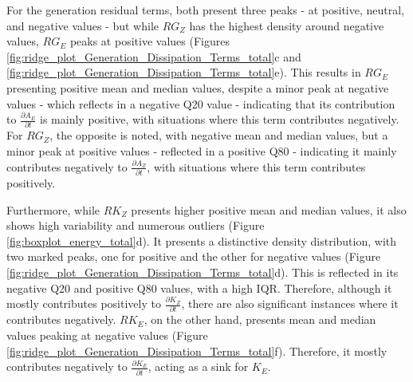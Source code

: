 For the generation residual terms, both present three peaks - at positive, neutral, and negative values - but while $RG_Z$ has the highest density around negative values, $RG_E$ peaks at positive values (Figures \ref{fig:ridge_plot_Generation_Dissipation_Terms_total}c and \ref{fig:ridge_plot_Generation_Dissipation_Terms_total}e). This results in $RG_E$ presenting positive mean and median values, despite a minor peak at negative values - which reflects in a negative Q20 value - indicating that its contribution to $\frac{\partial A_E}{\partial t}$ is mainly positive, with situations where this term contributes negatively. For $RG_Z$, the opposite is noted, with negative mean and median values, but a minor peak at positive values - reflected in a positive Q80 - indicating it mainly contributes negatively to $\frac{\partial A_Z}{\partial t}$, with situations where this term contributes positively.

Furthermore, while $RK_Z$ presents higher positive mean and median values, it also shows high variability and numerous outliers (Figure \ref{fig:boxplot_energy_total}d). It presents a distinctive density distribution, with two marked peaks, one for positive and the other for negative values (Figure \ref{fig:ridge_plot_Generation_Dissipation_Terms_total}d). This is reflected in its negative Q20 and positive Q80 values, with a high IQR. Therefore, although it mostly contributes positively to $\frac{\partial K_Z}{\partial t}$, there are also significant instances where it contributes negatively. $RK_E$, on the other hand, presents mean and median values peaking at negative values (Figure \ref{fig:ridge_plot_Generation_Dissipation_Terms_total}f). Therefore, it mostly contributes negatively to $\frac{\partial K_E}{\partial t}$, acting as a sink for $K_E$.


